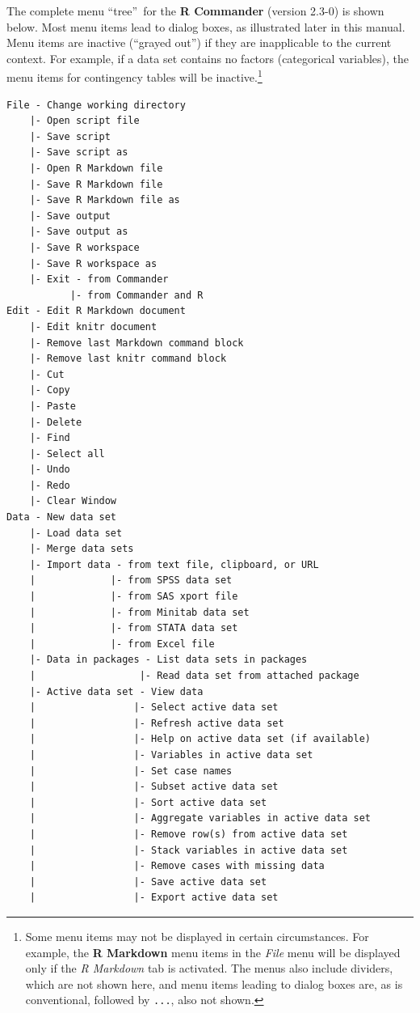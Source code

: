 \documentclass{article}%
\begin{document}
The complete menu \textquotedblleft tree\textquotedblright\ for the \textbf{R
Commander} (version 2.3-0) is shown below. Most menu items lead to dialog
boxes, as illustrated later in this manual. Menu items are inactive
(\textquotedblleft grayed out\textquotedblright) if they are inapplicable to
the current context. For example, if a data set contains no factors
(categorical variables), the menu items for contingency tables will be
inactive.\footnote{Some menu items may not be displayed in certain
circumstances. For example, the \textbf{R Markdown} menu items in the
\emph{File} menu will be displayed only if the \emph{R Markdown} tab is
activated. The menus
also include dividers, which are not shown here, and menu items leading to
dialog boxes are, as is conventional, followed by \texttt{...}, also not
shown.}
\begin{verbatim}
File - Change working directory
    |- Open script file
    |- Save script
    |- Save script as
    |- Open R Markdown file
    |- Save R Markdown file
    |- Save R Markdown file as
    |- Save output
    |- Save output as
    |- Save R workspace
    |- Save R workspace as
    |- Exit - from Commander
           |- from Commander and R
Edit - Edit R Markdown document
    |- Edit knitr document
    |- Remove last Markdown command block
    |- Remove last knitr command block
    |- Cut
    |- Copy
    |- Paste
    |- Delete
    |- Find
    |- Select all
    |- Undo
    |- Redo
    |- Clear Window
Data - New data set
    |- Load data set
    |- Merge data sets
    |- Import data - from text file, clipboard, or URL
    |             |- from SPSS data set
    |             |- from SAS xport file
    |             |- from Minitab data set
    |             |- from STATA data set
    |             |- from Excel file
    |- Data in packages - List data sets in packages
    |                  |- Read data set from attached package
    |- Active data set - View data
    |                 |- Select active data set
    |                 |- Refresh active data set
    |                 |- Help on active data set (if available)
    |                 |- Variables in active data set
    |                 |- Set case names
    |                 |- Subset active data set
    |                 |- Sort active data set
    |                 |- Aggregate variables in active data set
    |                 |- Remove row(s) from active data set
    |                 |- Stack variables in active data set
    |                 |- Remove cases with missing data
    |                 |- Save active data set
    |                 |- Export active data set

\end{verbatim}
\end{document}
